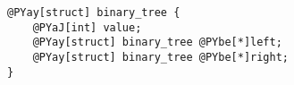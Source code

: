 \begin{Verbatim}[commandchars=@\[\]]
@PYay[struct] binary_tree {
    @PYaJ[int] value;
    @PYay[struct] binary_tree @PYbe[*]left;
    @PYay[struct] binary_tree @PYbe[*]right;
}
\end{Verbatim}
